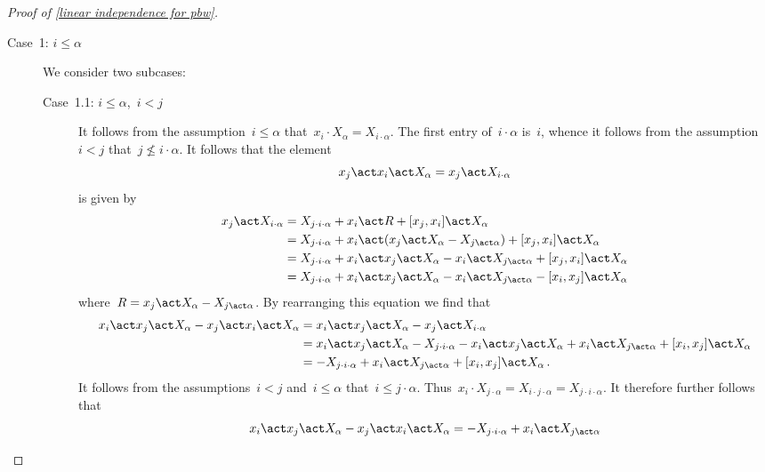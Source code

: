\begin{proof}[Proof of \cref{linear independence for pbw}]
	\begin{description}
		\item[Case~1: $i \leq \alpha$]
			We consider two subcases:
			\begin{description}
				\item[Case~1.1: $i \leq \alpha$,~$i < j$]
					It follows from the assumption~$i \leq \alpha$ that~$x_i \cdot X_\alpha = X_{i \cdot \alpha}$.
					The first entry of~$i \cdot \alpha$ is~$i$, whence it follows from the assumption~$i < j$ that~$j \nleq i \cdot \alpha$.
					It follows that the element
					\[
						x_j \act x_i \act X_\alpha
						=
						x_j \act X_{i \cdot \alpha}
					\]
					is given by
					\begin{align*}
						x_j \act X_{i \cdot \alpha}
						&=
						X_{j \cdot i \cdot \alpha}
						+ x_i \act R
						+ [x_j, x_i] \act X_\alpha
						\\
						&=
						X_{j \cdot i \cdot \alpha}
						+ x_i \act ( x_j \act X_\alpha - X_{j \act \alpha} )
						+ [x_j, x_i] \act X_\alpha
						\\
						&=
						X_{j \cdot i \cdot \alpha}
						+ x_i \act x_j \act X_\alpha
						- x_i \act X_{j \act \alpha}
						+ [x_j, x_i] \act X_\alpha
						\\
						&=
						X_{j \cdot i \cdot \alpha}
						+ x_i \act x_j \act X_\alpha
						- x_i \act X_{j \act \alpha}
						- [x_i, x_j] \act X_\alpha
					\end{align*}
					where~$R = x_j \act X_\alpha - X_{j \act \alpha}$.
					By rearranging this equation we find that
					\begin{align*}
						x_i \act x_j \act X_\alpha - x_j \act x_i \act X_\alpha
						&=
						x_i \act x_j \act X_\alpha - x_j \act X_{i \cdot \alpha}
						\\
						&=
						x_i \act x_j \act X_\alpha
						- X_{j \cdot i \cdot \alpha}
						- x_i \act x_j \act X_\alpha
						+ x_i \act X_{j \act \alpha}
						+ [x_i, x_j] \act X_\alpha
						\\
						&=
						- X_{j \cdot i \cdot \alpha}
						+ x_i \act X_{j \act \alpha}
						+ [x_i, x_j] \act X_\alpha \,.
					\end{align*}
					It follows from the assumptions~$i < j$ and~$i \leq \alpha$ that~$i \leq j \cdot \alpha$.
					Thus~$x_i \cdot X_{j \cdot \alpha} = X_{i \cdot j \cdot \alpha} = X_{j \cdot i \cdot \alpha}$.
					It therefore further follows that
					\[
						x_i \act x_j \act X_\alpha - x_j \act x_i \act X_\alpha
						=
						- X_{j \cdot i \cdot \alpha}
						+ x_i \act X_{j \act \alpha}
\]
\end{description}
\end{description}
\end{proof}

